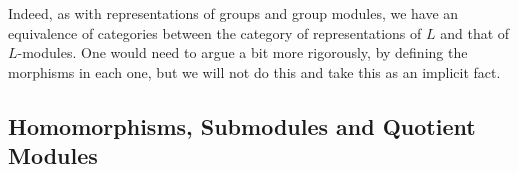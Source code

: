 Indeed, as with representations of groups and group modules, we have an equivalence of categories between the category of representations of $L$ and that of $L$-modules. One would need to argue a bit more rigorously, by defining the morphisms in each one, but we will not do this and take this as an implicit fact.

\subsection{Homomorphisms, Submodules and Quotient Modules}


